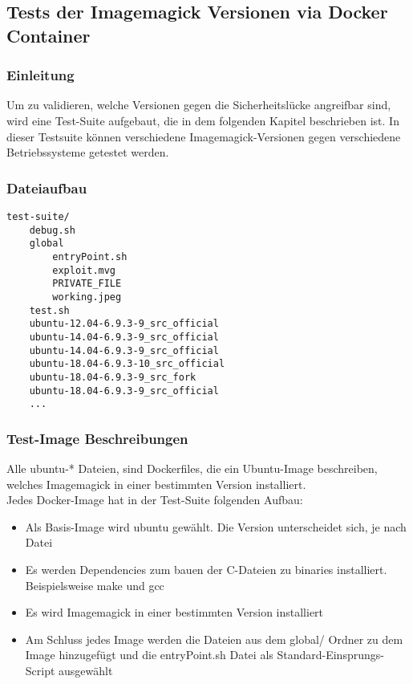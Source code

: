 \newpage
\subsection{Tests der Imagemagick Versionen via Docker Container}\label{subsec:tests-der-imagemagick-versionen-via-docker-container}

\subsubsection{Einleitung}

Um zu validieren, welche Versionen gegen die Sicherheitslücke angreifbar sind, wird eine Test-Suite aufgebaut,
die in dem folgenden Kapitel beschrieben ist.
In dieser Testsuite können verschiedene Imagemagick-Versionen gegen verschiedene Betriebssysteme getestet werden.

\subsubsection{Dateiaufbau}

\begin{lstlisting}[language=Text, caption=Übersicht über alle Dateien in der Testsuite,label={lst:testsuiteoverview}]
test-suite/
    debug.sh
    global
        entryPoint.sh
        exploit.mvg
        PRIVATE_FILE
        working.jpeg
    test.sh
    ubuntu-12.04-6.9.3-9_src_official
    ubuntu-14.04-6.9.3-9_src_official
    ubuntu-14.04-6.9.3-9_src_official
    ubuntu-18.04-6.9.3-10_src_official
    ubuntu-18.04-6.9.3-9_src_fork
    ubuntu-18.04-6.9.3-9_src_official
    ...
\end{lstlisting}
\vspace{5mm}

\subsubsection{Test-Image Beschreibungen}

Alle ubuntu-* Dateien, sind Dockerfiles, die ein Ubuntu-Image beschreiben,
welches Imagemagick in einer bestimmten Version installiert.\\

Jedes Docker-Image hat in der Test-Suite folgenden Aufbau:

\begin{itemize}
    \item Als Basis-Image wird ubuntu gewählt.
    Die Version unterscheidet sich, je nach Datei
    \item Es werden Dependencies zum bauen der C-Dateien zu binaries installiert.
    Beispielsweise make und gcc
    \item Es wird Imagemagick in einer bestimmten Version installiert
    \item Am Schluss jedes Image werden die Dateien aus dem global/ Ordner zu dem Image hinzugefügt und die entryPoint.sh Datei als Standard-Einsprungs-Script ausgewählt
\end{itemize}

